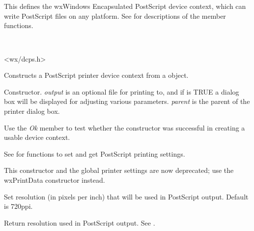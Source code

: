 \section{}\label{wxpostscriptdc}

This defines the wxWindows Encapsulated PostScript device context,
which can write PostScript files on any platform. See  for
descriptions of the member functions.


\\


<wx/dcps.h>



Constructs a PostScript printer device context from a  object.


Constructor. {\it output} is an optional file for printing to, and if
 is TRUE a dialog box will be displayed for adjusting
various parameters. {\it parent} is the parent of the printer dialog box.

Use the {\it Ok} member to test whether the constructor was successful
in creating a usable device context.

See  for functions to set and
get PostScript printing settings.

This constructor and the global printer settings are now deprecated;
use the wxPrintData constructor instead.


\label{wxpostscriptdcsetresolution}


Set resolution (in pixels per inch) that will be used in PostScript
output. Default is 720ppi.

\label{wxpostscriptdcgetresolution}


Return resolution used in PostScript output. See 
.

